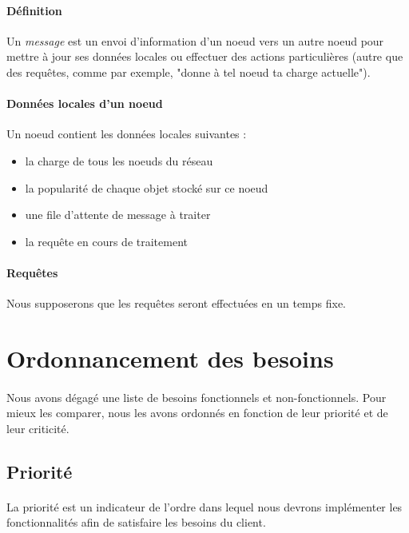 \documentclass[12pt]{article}
\begin{document}
\paragraph{Définition} Un \textit{message} est un envoi d'information d'un noeud vers un autre noeud pour mettre à jour ses données locales ou effectuer des actions particulières (autre que des requêtes, comme par exemple, "donne à tel noeud ta charge actuelle").

\paragraph{Données locales d'un noeud} Un noeud contient les données locales suivantes :
\begin{itemize}
 \item la charge de tous les noeuds du réseau
 \item la popularité de chaque objet stocké sur ce noeud
 \item une file d'attente de message à traiter
 \item la requête en cours de traitement
\end{itemize}

\paragraph{Requêtes} Nous supposerons que les requêtes seront effectuées en un temps fixe.

\newpage
\section{Ordonnancement des besoins}

\paragraph{} Nous avons dégagé une liste de besoins fonctionnels et non-fonctionnels. 
Pour mieux les comparer, nous les avons ordonnés en fonction de leur priorité et de leur criticité.


\subsection{Priorité}

\paragraph{} La priorité est un indicateur de l'ordre dans lequel nous devrons implémenter les fonctionnalités afin de satisfaire les besoins du client.
\end{document}
